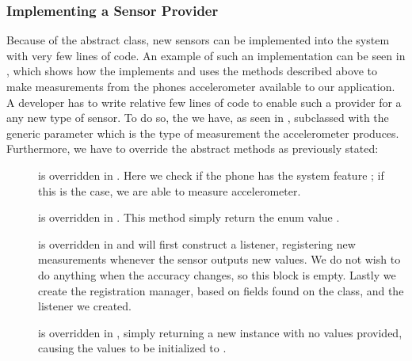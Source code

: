 \subsubsection{Implementing a Sensor Provider}
Because of the abstract  class, new sensors can be implemented into the system with very few lines of code. An example of such an implementation can be seen in , which shows how the  implements and uses the methods described above to make measurements from the phones accelerometer available to our application. A developer has to write relative few lines of code to enable such a provider for a any new type of sensor. To do so, the we have, as seen in , subclassed  with the generic parameter  which is the type of measurement the accelerometer produces. Furthermore, we have to override the abstract methods as previously stated: 

\begin{description}
  \item[] is overridden in . Here we check if the phone has the system feature ; if this is the case, we are able to measure accelerometer.

  \item[] is overridden in . This method simply return the enum value .

  \item[] is overridden in  and will first construct a listener, registering new measurements whenever the sensor outputs new values. We do not wish to do anything when the accuracy changes, so this block is empty. Lastly we create the registration manager, based on fields found on the  class, and the listener we created.

  \item[] is overridden in , simply returning a new  instance with no values provided, causing the values to be initialized to .
\end{description}

